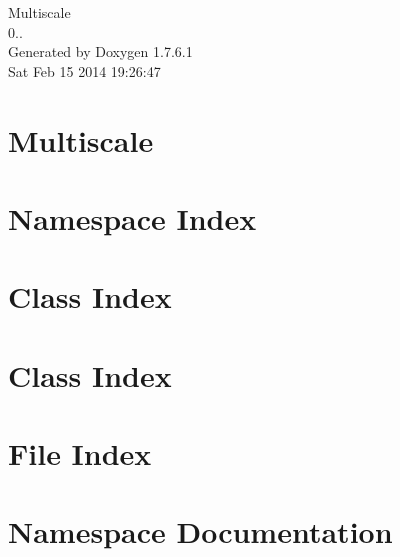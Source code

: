 \documentclass[a4paper]{book}
\begin{document}
\hypersetup{pageanchor=false,citecolor=blue}
\begin{titlepage}
\vspace*{7cm}
\begin{center}
{\Large \-Multiscale \\[1ex]\large 0.. }\\
\vspace*{1cm}
{\large \-Generated by Doxygen 1.7.6.1}\\
\vspace*{0.5cm}
{\small Sat Feb 15 2014 19:26:47}\\
\end{center}
\end{titlepage}
\clearemptydoublepage
{}
\tableofcontents
\clearemptydoublepage
{}
\hypersetup{pageanchor=true,citecolor=blue}
\chapter{\-Multiscale}
\label{index}\hypertarget{index}{}
\chapter{\-Namespace \-Index}

\chapter{\-Class \-Index}

\chapter{\-Class \-Index}

\chapter{\-File \-Index}

\chapter{\-Namespace \-Documentation}






\end{document}
